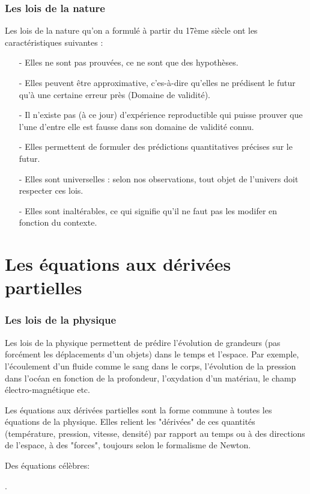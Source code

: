 \documentclass[11pt]{beamer}
\begin{document}
	\begin{frame}
		\frametitle{Les lois de la nature}
		Les lois de la nature qu'on a formulé à partir du 17ème siècle ont les caractéristiques suivantes : 
		\begin{itemize}
			\item[-] Elles ne sont pas prouvées, ce ne sont que des hypothèses. 
			\item[-] Elles peuvent être approximative, c'es-à-dire qu'elles ne prédisent le futur qu'à une certaine erreur près (Domaine de validité).
			\item[-] Il n'existe pas (à ce jour) d'expérience reproductible qui puisse prouver que l'une d'entre elle est fausse dans son domaine de validité connu. 
			\item[-] Elles permettent de formuler des prédictions quantitatives précises sur le futur. 
			\item[-] Elles sont universelles : selon nos observations, tout objet de l'univers doit respecter ces lois. 
			\item[-] Elles sont inaltérables, ce qui signifie qu'il ne faut pas les modifer en fonction du contexte. 
		\end{itemize}
	\end{frame}
	\section{Les équations aux dérivées partielles}
	\begin{frame}\frametitle{Les lois de la physique}
		Les lois de la physique permettent de prédire l'évolution de grandeurs (pas forcément les déplacements d'un objets) dans le temps et l'espace. Par exemple, l'écoulement d'un fluide comme le sang dans le corps, l'évolution de la pression dans l'océan en fonction de la profondeur, l'oxydation d'un matériau, le champ électro-magnétique etc.
		
		
		Les équations aux dérivées partielles sont la forme commune à toutes les équations de la physique. Elles relient les "dérivées" de ces quantités (température, pression, vitesse, densité) par rapport au temps ou à des directions de l'espace, à des "forces", toujours selon le formalisme de Newton. 
		
		 
		
	\end{frame}
	\begin{frame}
		Des équations célèbres: 
		
	\end{frame}
		. 
	
\end{document}
